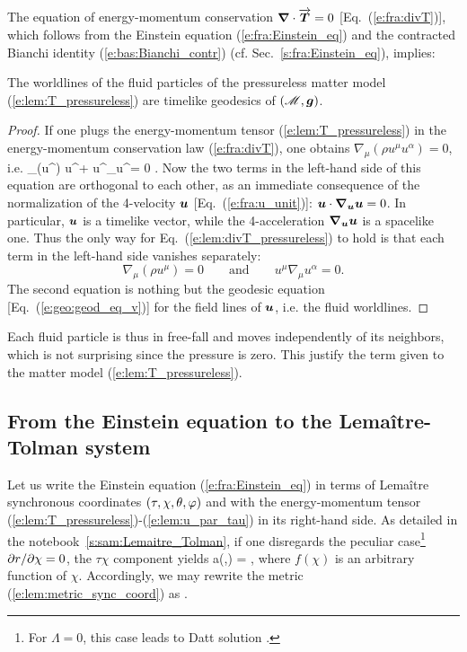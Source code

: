 The equation of energy-momentum conservation $\bm{\nabla}\cdot\overrightarrow{\bm{T}} = 0$
[Eq.~(\ref{e:fra:divT})], which
follows from the Einstein equation (\ref{e:fra:Einstein_eq}) and the contracted
Bianchi identity (\ref{e:bas:Bianchi_contr}) (cf. Sec.~\ref{s:fra:Einstein_eq}),
implies:
\begin{prop}
The worldlines of the fluid particles of the pressureless matter
model (\ref{e:lem:T_pressureless}) are timelike geodesics of
$(\mathscr{M},\bm{g})$.
\end{prop}
\begin{proof}
If one plugs the energy-momentum tensor (\ref{e:lem:T_pressureless}) in the
energy-momentum conservation law (\ref{e:fra:divT}), one obtains
$\nabla_\mu (\rho u^\mu u^\alpha )  = 0$,
i.e.
\be \label{e:lem:divT_pressureless}
    \nabla_\mu (\rho u^\mu) u^\alpha + \rho u^\mu \nabla_\mu u^\alpha = 0 .
\ee
Now the two terms in the left-hand side of this equation are orthogonal
to each other, as an immediate consequence of the normalization of the
4-velocity $\bm{u}$ [Eq.~(\ref{e:fra:u_unit})]:
$\bm{u}\cdot \bm{\nabla}_{\bm{u}}\bm{u} = 0$. In particular, $\bm{u}$
is a timelike vector, while the 4-acceleration $\bm{\nabla}_{\bm{u}}\bm{u}$
is a spacelike one. Thus the only way for Eq.~(\ref{e:lem:divT_pressureless})
to hold is  that each term
in the left-hand side vanishes separately:
\[
    \nabla_\mu (\rho u^\mu) = 0 \qquad\mbox{and}\qquad u^\mu \nabla_\mu u^\alpha = 0 .
\]
The second equation is nothing but the geodesic equation [Eq.~(\ref{e:geo:geod_eq_v})]
for the field lines of $\bm{u}$, i.e. the fluid worldlines.
\end{proof}
Each fluid particle is thus in free-fall and moves independently of its
neighbors, which is not surprising since the pressure is zero.
This justify the term  given to the matter
model (\ref{e:lem:T_pressureless}).

\subsection{From the Einstein equation to the Lemaître-Tolman system}

Let us write the Einstein equation (\ref{e:fra:Einstein_eq})
in terms of Lemaître synchronous coordinates $(\tau,\chi,\theta,\varphi)$
and with the energy-momentum tensor (\ref{e:lem:T_pressureless})-(\ref{e:lem:u_par_tau})
in its right-hand side.
As detailed in the notebook~\ref{s:sam:Lemaitre_Tolman},
if one disregards the peculiar case\footnote{For $\Lambda=0$, this case leads to
Datt solution \cite{Datt38}.} ${\partial r}/{\partial \chi} = 0$,
the $\tau\chi$ component yields
\be \label{e:lem:a_f_dr}
    a(\tau,\chi) =   ,
\ee
where $f(\chi)$ is an arbitrary function of $\chi$.
Accordingly, we may rewrite the metric (\ref{e:lem:metric_sync_coord}) as
\be \label{e:lem:metric_Lemaitre}
     .
\ee

